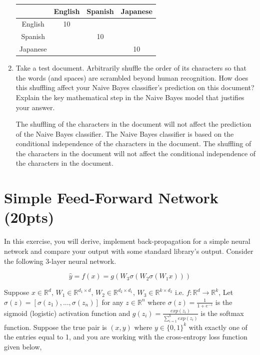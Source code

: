 \documentclass[10pt]{article}
\theoremstyle{definition}
\newenvironment{soln}{
    \leavevmode\color{blue}\ignorespaces
}{}
\begin{document}
\begin{enumerate}
          \begin{center}
              \begin{tabular}{c|ccc}
                           & English & Spanish & Japanese \\
                  \hline
                  English  & 10      &         &          \\
                  Spanish  &         & 10      &          \\
                  Japanese &         &         & 10
              \end{tabular}
          \end{center}

    \item Take a test document.   Arbitrarily shuffle the order of its characters so that the words (and spaces) are scrambled beyond human recognition.  How does this shuffling affect your Naive Bayes classifier's prediction on this document?  Explain the key mathematical step in the Naive Bayes model that justifies your answer.

          \begin{soln}
              The shuffling of the characters in the document will not affect the prediction of the Naive Bayes classifier. The Naive Bayes classifier is based on the conditional independence of the characters in the document. The shuffling of the characters in the document will not affect the conditional independence of the characters in the document.
          \end{soln}

\end{enumerate}

\section{Simple Feed-Forward Network (20pts)}
In this exercise, you will derive, implement back-propagation for a simple neural network and compare your output with some standard library’s output. Consider the following 3-layer neural network.

\[
    \hat{y} = f(x) = g(W_3\sigma(W_2\sigma(W_1x)))
\]

Suppose $x \in \mathbb{R}^d$, $W_1 \in \mathbb{R}^{d_1 \times d}$, $W_2 \in \mathbb{R}^{d_2 \times d_1}$, $W_3 \in \mathbb{R}^{k \times d_2}$ i.e. $f: \mathbb{R}^d \rightarrow \mathbb{R}^k$, Let $\sigma(z) = [\sigma(z_1), ..., \sigma(z_n)]$ for any $z \in \mathbb{R}^n$ where $\sigma(z) = \frac{1}{1 + e^{-z}}$ is the sigmoid (logistic) activation function and $g(z_i) = \frac{exp(z_i)}{\sum_{i=1}^k exp(z_i)}$ is the softmax function. Suppose the true pair is $(x, y)$ where $y \in \{0, 1\}^k$ with exactly one of the entries equal to 1, and you are working with the cross-entropy loss function given below,
\end{document}
